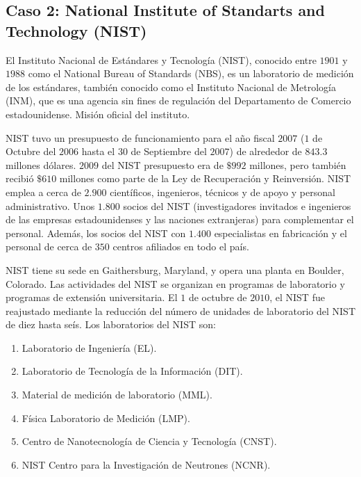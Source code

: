 \documentclass[titlepage,a4paper,twoside]{article}
\begin{document}
   
    \subsection{Caso 2: National Institute of Standarts and Technology (NIST)}
   
   
    El Instituto Nacional de Estándares y Tecnología (NIST), conocido entre $1901$ y $1988$ como el National Bureau of  Standards (NBS), es un laboratorio de medición de los estándares, también conocido como el Instituto Nacional de Metrología (INM), que es una agencia sin fines de regulación del Departamento de Comercio estadounidense. Misión oficial del instituto.
   
    NIST tuvo un presupuesto de funcionamiento para el año fiscal $2007$ ($1$ de Octubre del $2006$ hasta el $30$ de Septiembre del $2007$) de alrededor de $843.3$ millones dólares. $2009$ del NIST presupuesto era de $\$992$ millones, pero también recibió $\$610$ millones como parte de la Ley de Recuperación y Reinversión. NIST emplea a cerca de $2.900$ científicos, ingenieros, técnicos y de apoyo y personal administrativo. Unos $1.800$ socios del NIST (investigadores invitados e ingenieros de las empresas estadounidenses y las naciones extranjeras) para complementar el personal. Además, los socios del NIST con $1.400$ especialistas en fabricación y el personal de cerca de $350$ centros afiliados en todo el país.
   
    NIST tiene su sede en Gaithersburg, Maryland, y opera una planta en Boulder, Colorado. Las actividades del NIST se organizan en programas de laboratorio y programas de extensión universitaria. El $1$ de octubre de $2010$, el NIST fue reajustado mediante la reducción del número de unidades de laboratorio del NIST de diez hasta seís. Los laboratorios del NIST son:
    
    \begin{enumerate}
    	\item Laboratorio de Ingeniería (EL).
    	\item Laboratorio de Tecnología de la Información (DIT). 
    	\item Material de medición de laboratorio (MML). 
    	\item Física Laboratorio de Medición (LMP).
    	\item Centro de Nanotecnología de Ciencia y Tecnología (CNST).
    	\item NIST Centro para la Investigación de Neutrones (NCNR).
    \end{enumerate}
   
\end{document}
